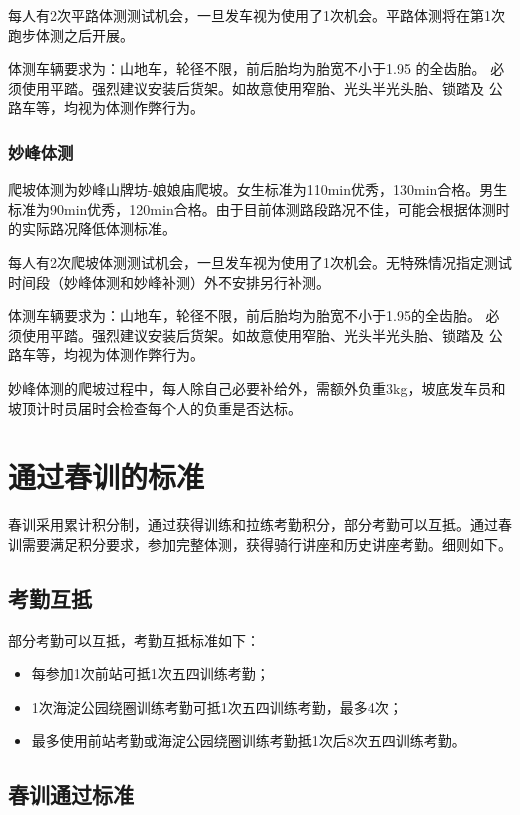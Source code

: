 \documentclass[UTF8]{ctexart}
\begin{document}
每人有2次平路体测测试机会，一旦发车视为使用了1次机会。平路体测将在第1次跑步体测之后开展。

体测车辆要求为：山地车，轮径不限，前后胎均为胎宽不小于1.95 的全齿胎。
必须使用平踏。强烈建议安装后货架。如故意使用窄胎、光头半光头胎、锁踏及
公路车等，均视为体测作弊行为。

\subsubsection{妙峰体测}

爬坡体测为妙峰山牌坊-娘娘庙爬坡。女生标准为110min优秀，130min合格。男生标准为90min优秀，120min合格。由于目前体测路段路况不佳，可能会根据体测时的实际路况降低体测标准。

每人有2次爬坡体测测试机会，一旦发车视为使用了1次机会。无特殊情况指定测试时间段（妙峰体测和妙峰补测）外不安排另行补测。

体测车辆要求为：山地车，轮径不限，前后胎均为胎宽不小于1.95的全齿胎。
必须使用平踏。强烈建议安装后货架。如故意使用窄胎、光头半光头胎、锁踏及
公路车等，均视为体测作弊行为。

妙峰体测的爬坡过程中，每人除自己必要补给外，需额外负重3kg，坡底发车员和坡顶计时员届时会检查每个人的负重是否达标。

\section{通过春训的标准}

春训采用累计积分制，通过获得训练和拉练考勤积分，部分考勤可以互抵。通过春训需要满足积分要求，参加完整体测，获得骑行讲座和历史讲座考勤。细则如下。

\subsection{考勤互抵}

部分考勤可以互抵，考勤互抵标准如下：

\begin{itemize}[nosep,left=4em]
    \item 每参加1次前站可抵1次五四训练考勤；
    \item 1次海淀公园绕圈训练考勤可抵1次五四训练考勤，最多4次；
    \item 最多使用前站考勤或海淀公园绕圈训练考勤抵1次后8次五四训练考勤。 
\end{itemize}


\subsection{春训通过标准}
\end{document}
